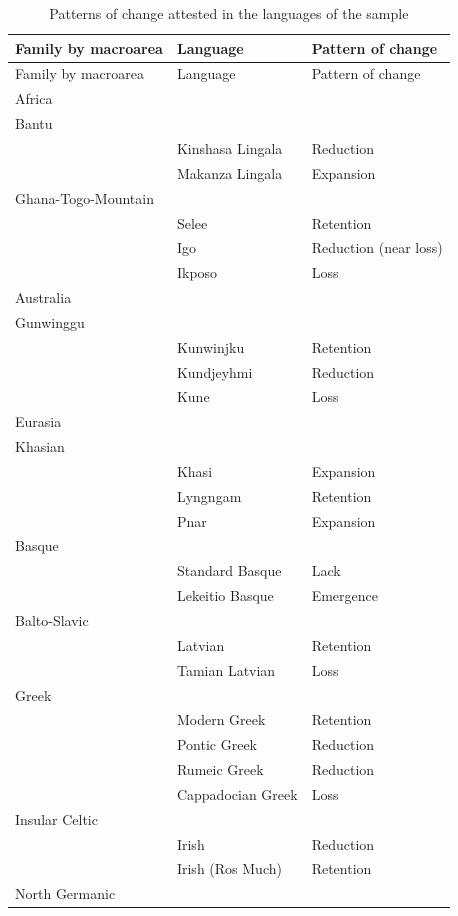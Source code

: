 \documentclass[output=collectionpaper]{langsci/langscibook}
\begin{document}
\begin{longtable}{lll}
\caption{Patterns of change attested in the languages of the sample\label{tb:patterns}}\\
\lsptoprule
Family by macroarea & Language & Pattern of change\\\midrule\endfirsthead
\midrule Family by macroarea & Language & Pattern of change\\\midrule\endhead
\endfoot\lspbottomrule\endlastfoot
Africa &&\\
\midrule
Bantu & &\\
&Kinshasa Lingala& Reduction\\
& Makanza Lingala& Expansion\\
Ghana-Togo-Mountain && \\
& Selee& Retention\\
&Igo& Reduction (near loss)\\
& Ikposo& Loss\\
\midrule
Australia &&\\
\midrule
 Gunwinggu && \\
&Kunwinjku &Retention\\
&Kundjeyhmi& Reduction \\
&Kune& Loss \\
\midrule
Eurasia &&\\
\midrule
Khasian&  &\\
&Khasi& Expansion\\
&Lyngngam& Retention\\
&Pnar&Expansion\\
Basque &&  \\
&Standard Basque&Lack\\
&Lekeitio Basque&Emergence\\
Balto-Slavic&&\\
& Latvian&Retention\\
& Tamian Latvian&Loss\\
Greek&&\\
&Modern Greek&Retention \\
&Pontic Greek & Reduction\\
&Rumeic Greek &Reduction\\
&Cappadocian Greek& Loss \\
Insular Celtic &&\\
& Irish& Reduction\\
& Irish (Ros Much)&Retention\\
North Germanic &&\\

\end{longtable}
\end{document}
